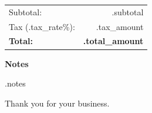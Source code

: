 \documentclass[a4paper,11pt]{article}
\begin{document}
\vspace{0.5cm}


\begin{flushright}

\begin{tabular}{lr}

Subtotal: &
{{.subtotal}} \\

Tax ({{.tax_rate}}\%): &
{{.tax_amount}} \\

\textbf{Total:} &
\textbf{{.total_amount}} \\

\end{tabular}

\end{flushright}

\vspace{1cm}


\textbf{Notes}

\vspace{0.2cm}

{{.notes}}

\vspace{1cm}

Thank you for your business.
\end{document}
